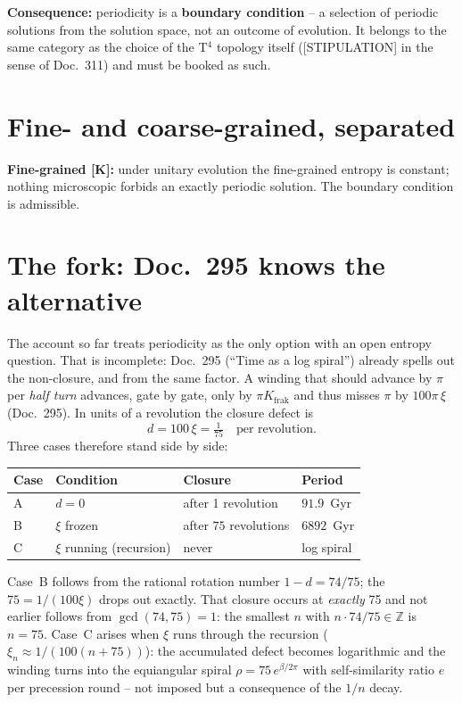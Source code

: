 \textbf{Consequence:} periodicity is a \textbf{boundary
condition} -- a selection of periodic solutions from the solution
space, not an outcome of evolution. It belongs to the same
category as the choice of the T$^4$ topology itself ([STIPULATION]
in the sense of Doc.~311) and must be booked as such.

\section{Fine- and coarse-grained, separated}

\textbf{Fine-grained [K]:} under unitary evolution the
fine-grained entropy is constant; nothing microscopic forbids an
exactly periodic solution. The boundary condition is admissible.

\section{The fork: Doc.~295 knows the alternative}

The account so far treats periodicity as the only option with an
open entropy question. That is incomplete: Doc.~295
(\enquote{Time as a log spiral}) already spells out the
non-closure, and from the same factor. A winding that should
advance by $\pi$ per \emph{half turn} advances, gate by gate, only
by $\pi K_\text{frak}$ and thus misses $\pi$ by $100\pi\,\xi$
(Doc.~295). In units of a revolution the closure defect is
\begin{equation}
  d = 100\,\xi = \tfrac{1}{75}\quad\text{per revolution.}
\end{equation}
Three cases therefore stand side by side:

\begin{center}
\begin{tabular}{llll}
\toprule
Case & Condition & Closure & Period \\
\midrule
A & $d = 0$ & after 1 revolution & $91.9$~Gyr \\
B & $\xi$ frozen & after $75$ revolutions & $6892$~Gyr \\
C & $\xi$ running (recursion) & never & log spiral \\
\bottomrule
\end{tabular}
\end{center}

\noindent Case~B follows from the rational rotation number
$1-d = 74/75$; the $75 = 1/(100\xi)$ drops out exactly. That closure occurs at \emph{exactly}
75 and not earlier follows from $\gcd(74,75) = 1$: the smallest
$n$ with $n\cdot 74/75 \in \mathbb{Z}$ is $n = 75$. Case~C
arises when $\xi$ runs through the recursion
($\xi_n \approx 1/(100(n{+}75))$): the accumulated defect becomes
logarithmic and the winding turns into the equiangular spiral
$\rho = 75\,e^{\beta/2\pi}$ with self-similarity ratio $e$ per
precession round -- not imposed but a consequence of the $1/n$
decay.

